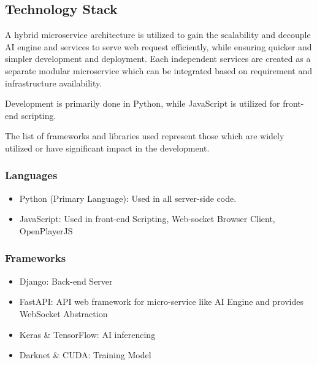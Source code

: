 \subsection*{Technology Stack}
A hybrid microservice architecture is utilized to gain the scalability and decouple AI engine and services to serve web request efficiently, while ensuring quicker and simpler development and deployment. Each independent services are created as a separate modular microservice which can be integrated based on requirement and infrastructure availability.

Development is primarily done in Python, while JavaScript is utilized for front-end scripting.

The list of frameworks and libraries used represent those which are widely utilized or have significant impact in the development.

\subsubsection*{Languages}
\begin{itemize}
	\item Python (Primary Language): Used in all server-side code.
	\item JavaScript: Used in front-end Scripting, Web-socket Browser Client, OpenPlayerJS
\end{itemize}

\subsubsection*{Frameworks}
\begin{itemize}
	\item Django: Back-end Server
	\item FastAPI: API web framework for micro-service like AI Engine and provides WebSocket Abstraction
	\item Keras \& TensorFlow: AI inferencing
	\item Darknet \& CUDA: Training Model
\end{itemize}

